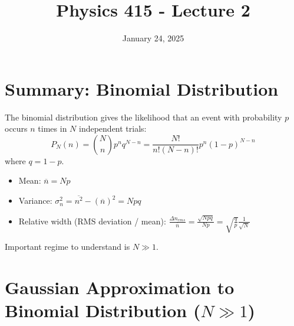 \documentclass[11pt]{article}
\title{Physics 415 - Lecture 2}
\date{January 24, 2025}
\author{} %
\newcommand{\avg}[1]{\overline{#1}}
\begin{document}
\maketitle
\thispagestyle{empty}

\section*{Summary: Binomial Distribution}

The binomial distribution gives the likelihood that an event with probability $p$ occurs $n$ times in $N$ independent trials:
\[ P_N(n) = \binom{N}{n} p^n q^{N-n} = \frac{N!}{n!(N-n)!} p^n (1-p)^{N-n} \]
where $q=1-p$.
\begin{itemize}
    \item Mean: $\avg{n} = Np$
    \item Variance: $\sigma_n^2 = \avg{n^2} - (\avg{n})^2 = Npq$
    \item Relative width (RMS deviation / mean): $\frac{\Delta n_{rms}}{\avg{n}} = \frac{\sqrt{Npq}}{Np} = \sqrt{\frac{q}{p}} \frac{1}{\sqrt{N}}$
\end{itemize}
Important regime to understand is $N \gg 1$.

\section*{Gaussian Approximation to Binomial Distribution ($N \gg 1$)}
\end{document}
